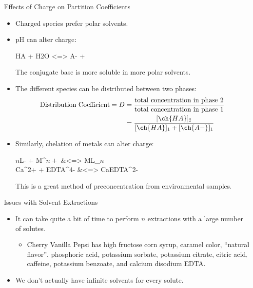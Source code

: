 \documentclass[11pt,letterpaper]{article}
\begin{document}
\begin{frame}{Effects of Charge on Partition Coefficients}
	\begin{itemize}[<+->]
		\item Charged species prefer polar solvents.
		\item pH can alter charge:
			\begin{reaction*}
				HA + H2O <=> A- + \Oxo 
			\end{reaction*}
				The conjugate base is more soluble in more
					polar solvents.
				\item The different species can be
					\alert{distributed} between two phases:
					\begin{align*}
						\text{Distribution Coefficient}
						= D &= \frac{\text{total
						concentration in phase
						2}}{\text{total concentration in
						phase 1}} \\
						&=
						\frac{[\ch{HA}]_2}{[\ch{HA}]_1 +
						[\ch{A-}]_1}
					\end{align*}
		\item Similarly, chelation of metals can alter charge:
			\begin{reactions*}
				$n$L- + M^{$n+$} &<=> ML_{$n$} \\
				Ca^2+ + EDTA^4- &<=> CaEDTA^2-
			\end{reactions*}
			This is a great method of \alert{preconcentration} from
			environmental samples.
	\end{itemize}
\end{frame}

\clearpage

\begin{frame}{Issues with Solvent Extractions}
	\begin{itemize}
		\item It can take quite a bit of time to perform $n$ extractions
			with a large number of solutes.
			\begin{itemize}
				\item Cherry Vanilla Pepsi has high fructose
					corn syrup, caramel color, ``natural
					flavor'', phosphoric acid, potassium
					sorbate, potassium citrate, citric acid,
					caffeine, potassium benzoate, and
					calcium disodium EDTA. 
			\end{itemize}
		\item We don't actually have infinite solvents for every solute.
%
%
	\end{itemize}
\end{frame}
\end{document}
